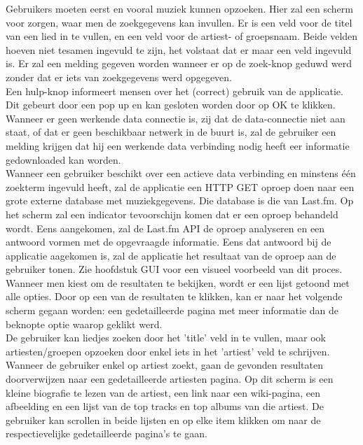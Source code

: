 \documentclass[11pt,a4paper]{article}
\begin{document}
Gebruikers moeten eerst en vooral muziek kunnen opzoeken. Hier zal een scherm voor zorgen, waar men de zoekgegevens kan invullen. Er is een veld voor de titel van een lied in te vullen, en een veld voor de artiest- of groepsnaam. Beide velden hoeven niet tesamen ingevuld te zijn, het volstaat dat er maar een veld ingevuld is. Er zal een melding gegeven worden wanneer er op de zoek-knop geduwd werd zonder dat er iets van zoekgegevens werd opgegeven.
\\ 

Een hulp-knop informeert mensen over het (correct) gebruik van de applicatie. Dit gebeurt door een pop up en kan gesloten worden door op OK te klikken. 
\\ 
 
Wanneer er geen werkende data connectie is, zij dat de data-connectie niet aan staat, of dat er geen beschikbaar netwerk in de buurt is, zal de gebruiker een melding krijgen dat hij een werkende data verbinding nodig heeft eer informatie gedownloaded kan worden. 
\\ 
	
Wanneer een gebruiker beschikt over een actieve data verbinding en minstens één zoekterm ingevuld heeft, zal de applicatie een HTTP GET oproep doen naar een grote externe database met muziekgegevens. Die database is die van Last.fm. Op het scherm zal een indicator tevoorschijn komen dat er een oproep behandeld wordt. Eens aangekomen, zal de Last.fm API de oproep analyseren en een antwoord vormen met de opgevraagde informatie. Eens dat antwoord bij de applicatie aagekomen is, zal de applicatie het resultaat van de oproep aan de gebruiker tonen. Zie hoofdstuk GUI voor een visueel voorbeeld van dit proces. 
\\ 
	
Wanneer men kiest om de resultaten te bekijken, wordt er een lijst getoond met alle opties. Door op een van de resultaten te klikken, kan er naar het volgende scherm gegaan worden: een gedetailleerde pagina met meer informatie dan de beknopte optie waarop geklikt werd. 
\\ 
	
De gebruiker kan liedjes zoeken door het 'title' veld in te vullen, maar ook artiesten/groepen opzoeken door enkel iets in het 'artiest' veld te schrijven. Wanneer de gebruiker enkel op artiest zoekt, gaan de gevonden resultaten doorverwijzen naar een gedetailleerde artiesten pagina. Op dit scherm is een kleine biografie te lezen van de artiest, een link naar een wiki-pagina, een afbeelding en een lijst van de top tracks en top albums van die artiest. De gebruiker kan scrollen in beide lijsten en op elke item klikken om naar de respectievelijke gedetailleerde pagina's te gaan.
\\
\end{document}
